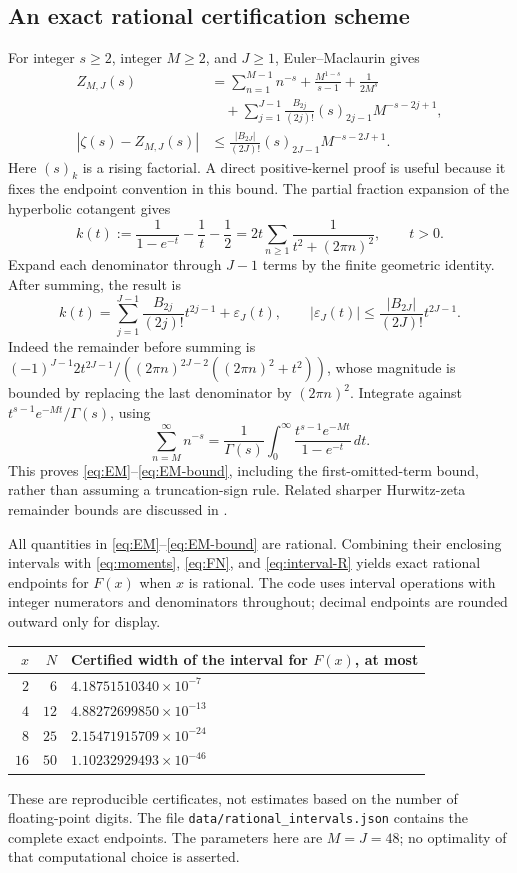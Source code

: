 \documentclass[11pt]{article}
\numberwithin{equation}{section}
\theoremstyle{definition}
\theoremstyle{remark}
\begin{document}
\subsection{An exact rational certification scheme}

For integer $s\ge2$, integer $M\ge2$, and $J\ge1$, Euler--Maclaurin
gives
\begin{align}
 Z_{M,J}(s)
 &=\sum_{n=1}^{M-1}n^{-s}
   +\frac{M^{1-s}}{s-1}+\frac1{2M^s}\nonumber\\
 &\quad+\sum_{j=1}^{J-1}
 \frac{B_{2j}}{(2j)!}(s)_{2j-1}M^{-s-2j+1},\label{eq:EM}\\
 |\zeta(s)-Z_{M,J}(s)|
 &\le
 \frac{|B_{2J}|}{(2J)!}(s)_{2J-1}M^{-s-2J+1}.
 \label{eq:EM-bound}
\end{align}
Here $(s)_k$ is a rising factorial. A direct positive-kernel proof
is useful because it fixes the endpoint convention in this bound.
The partial fraction expansion of the hyperbolic cotangent gives
\[
 k(t):=\frac1{1-e^{-t}}-\frac1t-\frac12
       =2t\sum_{n\ge1}\frac1{t^2+(2\pi n)^2},\qquad t>0.
\]
Expand each denominator through $J-1$ terms by the finite geometric
identity. After summing, the result is
\[
 k(t)=\sum_{j=1}^{J-1}\frac{B_{2j}}{(2j)!}t^{2j-1}
           +\varepsilon_J(t),\qquad
 |\varepsilon_J(t)|
 \le\frac{|B_{2J}|}{(2J)!}t^{2J-1}.
\]
Indeed the remainder before summing is
$(-1)^{J-1}2t^{2J-1}/
((2\pi n)^{2J-2}((2\pi n)^2+t^2))$, whose magnitude is bounded
by replacing the last denominator by $(2\pi n)^2$.
Integrate against $t^{s-1}e^{-Mt}/\Gamma(s)$, using
\[
 \sum_{n=M}^\infty n^{-s}
 =\frac1{\Gamma(s)}
       \int_0^\infty\frac{t^{s-1}e^{-Mt}}{1-e^{-t}}\,dt.
\]
This proves \eqref{eq:EM}--\eqref{eq:EM-bound}, including the
first-omitted-term bound, rather than assuming a truncation-sign rule.
Related sharper Hurwitz-zeta remainder bounds are discussed in
\cite{Nemes}.

All quantities in \eqref{eq:EM}--\eqref{eq:EM-bound} are rational.
Combining their enclosing intervals with
\eqref{eq:moments}, \eqref{eq:FN}, and \eqref{eq:interval-R} yields
exact rational endpoints for $F(x)$ when $x$ is rational.
The code uses interval operations with integer numerators and
denominators throughout; decimal endpoints are rounded outward only
for display.

\begin{center}
\begin{tabular}{rrl}
\toprule
$x$ & $N$ & Certified width of the interval for $F(x)$, at most\\
\midrule
$2$  & $6$  & $4.18751510340\times10^{-7}$\\
$4$  & $12$ & $4.88272699850\times10^{-13}$\\
$8$  & $25$ & $2.15471915709\times10^{-24}$\\
$16$ & $50$ & $1.10232929493\times10^{-46}$\\
\bottomrule
\end{tabular}
\end{center}
These are reproducible certificates, not estimates based on the number
of floating-point digits. The file
\texttt{data/rational\_intervals.json} contains the complete exact
endpoints. The parameters here are $M=J=48$; no optimality of that
computational choice is asserted.
\end{document}
